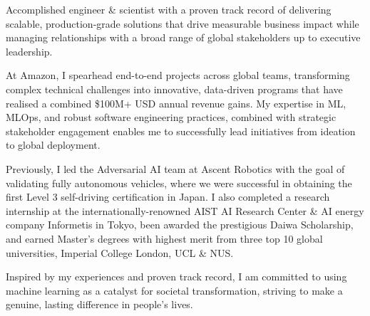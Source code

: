 

\begin{cvparagraph}

Accomplished engineer \& scientist with a proven track record of delivering scalable, production-grade solutions that drive measurable business impact while managing relationships with a broad range of global stakeholders up to executive leadership.

At Amazon, I spearhead end-to-end projects across global teams, transforming complex technical challenges into innovative, data-driven programs that have realised a combined \$100M+ USD annual revenue gains. My expertise in ML, MLOps, and robust software engineering practices, combined with strategic stakeholder engagement enables me to successfully lead initiatives from ideation to global deployment.

Previously, I led the Adversarial AI team at Ascent Robotics with the goal of validating fully autonomous vehicles, where we were successful in obtaining the first Level 3 self-driving certification in Japan. I also completed a research internship at the internationally-renowned AIST AI Research Center \& AI energy company Informetis in Tokyo, been awarded the prestigious Daiwa Scholarship, and earned Master's degrees with highest merit from three top 10 global universities, Imperial College London, UCL \& NUS. 

Inspired by my experiences and proven track record, I am committed to using machine learning as a catalyst for societal transformation, striving to make a genuine, lasting difference in people's lives.



\end{cvparagraph}